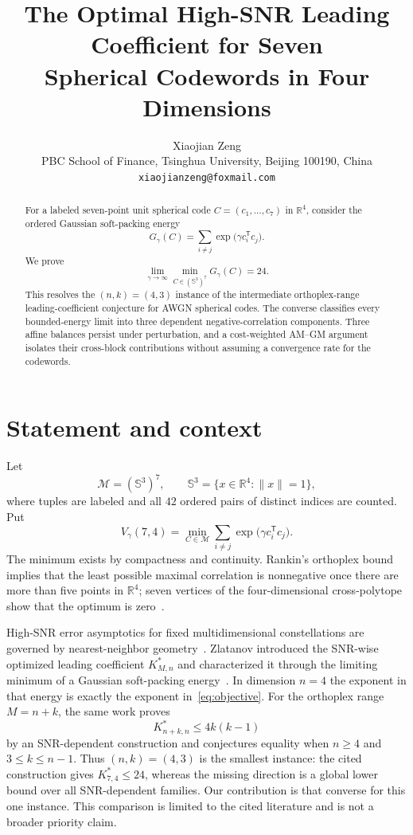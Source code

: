 \documentclass[11pt]{article}
\title{The Optimal High-SNR Leading Coefficient for Seven\\
Spherical Codewords in Four Dimensions}
\author{Xiaojian Zeng\\
\small PBC School of Finance, Tsinghua University, Beijing 100190, China\\
\small \texttt{xiaojianzeng@foxmail.com}}
\date{}
\newcommand{\R}{\mathbb{R}}
\newcommand{\Sph}{\mathbb{S}}
\newcommand{\norm}[1]{\lVert #1\rVert}
\begin{document}
\maketitle

\begin{abstract}
For a labeled seven-point unit spherical code
$C=(c_1,\ldots,c_7)$ in $\R^4$, consider the ordered Gaussian
soft-packing energy
\[
  G_\gamma(C)=\sum_{i\neq j}\exp\!\bigl(\gamma c_i^{\mathsf T}c_j\bigr).
\]
We prove
\[
 \lim_{\gamma\to\infty}\min_{C\in(\Sph^3)^7}G_\gamma(C)=24.
\]
This resolves the $(n,k)=(4,3)$ instance of the intermediate
orthoplex-range leading-coefficient conjecture for AWGN spherical codes.
The converse classifies every bounded-energy limit into three dependent
negative-correlation components.  Three affine balances persist under
perturbation, and a cost-weighted AM--GM argument isolates their cross-block
contributions without assuming a convergence rate for the codewords.
\end{abstract}

\section{Statement and context}

Let
\[
 \mathcal M=(\Sph^3)^7,
 \qquad \Sph^3=\{x\in\R^4:\norm{x}=1\},
\]
where tuples are labeled and all $42$ ordered pairs of distinct indices are
counted.  Put
\begin{equation}\label{eq:objective}
 V_\gamma(7,4)=\min_{C\in\mathcal M}
 \sum_{i\neq j}\exp\!\bigl(\gamma c_i^{\mathsf T}c_j\bigr).
\end{equation}
The minimum exists by compactness and continuity.  Rankin's orthoplex bound
implies that the least possible maximal correlation is nonnegative once there
are more than five points in $\R^4$; seven vertices of the four-dimensional
cross-polytope show that the optimum is zero~\cite{Rankin1955}.

High-SNR error asymptotics for fixed multidimensional constellations are
governed by nearest-neighbor geometry~\cite{AlvaradoAgrellBrannstrom2018}.
Zlatanov introduced the SNR-wise optimized leading coefficient
$K^*_{M,n}$ and characterized it through the limiting minimum of a Gaussian
soft-packing energy~\cite{Zlatanov2026}.  In dimension $n=4$ the exponent in
that energy is exactly the exponent in~\eqref{eq:objective}.  For the
orthoplex range $M=n+k$, the same work proves
\[
 K^*_{n+k,n}\le 4k(k-1)
\]
by an SNR-dependent construction and conjectures equality when
$n\ge4$ and $3\le k\le n-1$.  Thus $(n,k)=(4,3)$ is the smallest instance:
the cited construction gives $K^*_{7,4}\le24$, whereas the missing direction
is a global lower bound over all SNR-dependent families.  Our contribution is
that converse for this one instance.  This comparison is limited to the cited
literature and is not a broader priority claim.
\end{document}
